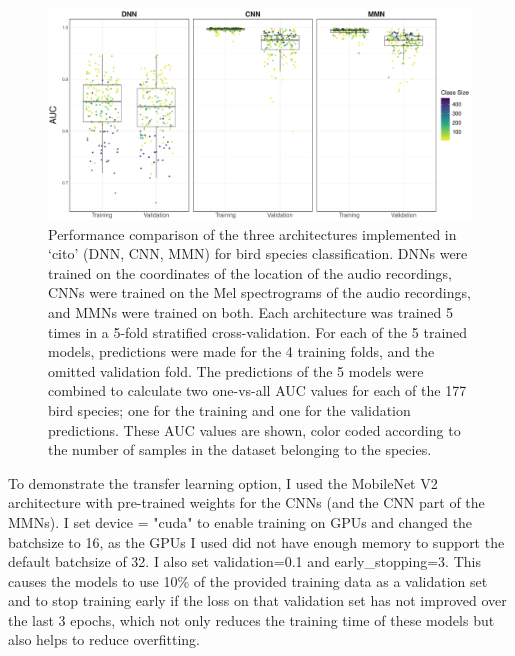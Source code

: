 \documentclass[12pt,twoside]{scrreport}
\newcommand{\pkg}[1]{`#1'}
\begin{document}
\begin{figure}[h]
	\centering
	\resizebox{\textwidth}{!}{\usebox{\dnn}}
\end{figure}

\begin{figure}[h!]
	\includegraphics[width=\textwidth]{../analysis/results/figures/auc_beehive.pdf}
	\caption{Performance comparison of the three architectures implemented in \pkg{cito} (DNN, CNN, MMN) for bird species classification. DNNs were trained on the coordinates of the location of the audio recordings, CNNs were trained on the Mel spectrograms of the audio recordings, and MMNs were trained on both. Each architecture was trained 5 times in a 5-fold stratified cross-validation. For each of the 5 trained models, predictions were made for the 4 training folds, and the omitted validation fold. The predictions of the 5 models were combined to calculate two one-vs-all AUC values for each of the 177 bird species; one for the training and one for the validation predictions. These AUC values are shown, color coded according to the number of samples in the dataset belonging to the species.}
	\label{beehive}
	\vspace{1cm}
	\resizebox{\textwidth}{!}{\usebox{\cnn}}
	\newpage
\end{figure}



To demonstrate the transfer learning option, I used the MobileNet V2 \citep{sandlerMobileNetV2InvertedResiduals2019} architecture with pre-trained weights for the CNNs (and the CNN part of the MMNs). I set device = "cuda" to enable training on GPUs and changed the batchsize to 16, as the GPUs I used did not have enough memory to support the default batchsize of 32. I also set validation=0.1 and early\_stopping=3. This causes the models to use 10\% of the provided training data as a validation set and to stop training early if the loss on that validation set has not improved over the last 3 epochs, which not only reduces the training time of these models but also helps to reduce overfitting.
\end{document}
